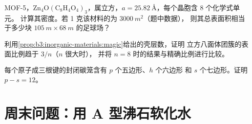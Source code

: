 \begin{exercise}[$\star\star\star$]\label{exo:b3:inorganic-materials:10}
MOF-5，$\mathrm{Zn_4O(C_8H_4O_4)_3}$，属立方，$a = \qty{25.82}{\angstrom}$，每个晶胞含 8 个化学式单元。
计算其密度。若 1 克该材料的为 $\qty{3000}{m^2}$（题中数据），
则其总表面积相当于多少块 $\qty{105}{m} \times \qty{68}{m}$ 的足球场？
\end{exercise}

\begin{exercise}[$\star\star\star$]\label{exo:b3:inorganic-materials:11}
利用\cref{prop:b3:inorganic-materials:magic}给出的壳层数，证明
立方八面体团簇的表面比例趋于 $3/n$（$n$ 很大时），
并将 $n = 8$ 时的结果与精确比例进行比较。
\end{exercise}

\begin{exercise}[$\star\star\star$]\label{exo:b3:inorganic-materials:12}
每个原子成三根键的封闭碳笼含有 $p$ 个五边形、$h$ 个六边形
和 $s$ 个七边形。证明 $p - s = 12$。
\end{exercise}

\section{周末问题：用 A 型沸石软化水}

